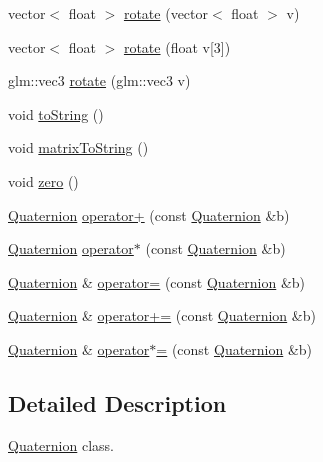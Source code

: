 \begin{DoxyCompactItemize}
\item 
vector$<$ float $>$ \hyperlink{classQuaternion_aff3eac8f2ff148c399fa39e16594ce1f}{rotate} (vector$<$ float $>$ v)
\item 
vector$<$ float $>$ \hyperlink{classQuaternion_a341d532ec38393c75673d1b3a3ec9e2f}{rotate} (float v\mbox{[}3\mbox{]})
\item 
glm\-::vec3 \hyperlink{classQuaternion_a96d763a210463981dc621b0bf8a84259}{rotate} (glm\-::vec3 v)
\item 
void \hyperlink{classQuaternion_aa3bbfe668e104769f47344dc6e63eb5b}{to\-String} ()
\item 
void \hyperlink{classQuaternion_a0bf91c04839f665014253c74a0461461}{matrix\-To\-String} ()
\item 
void \hyperlink{classQuaternion_a5be74768bcc366ea59a9c6adffdcdd4e}{zero} ()
\item 
\hyperlink{classQuaternion}{Quaternion} \hyperlink{classQuaternion_a8ab54a1bd23bcbb4476c831f7c0068a2}{operator+} (const \hyperlink{classQuaternion}{Quaternion} \&b)
\item 
\hyperlink{classQuaternion}{Quaternion} \hyperlink{classQuaternion_af29f524832881bd5d63d5ab91d45f4ec}{operator$\ast$} (const \hyperlink{classQuaternion}{Quaternion} \&b)
\item 
\hyperlink{classQuaternion}{Quaternion} \& \hyperlink{classQuaternion_a3641a98c644ddeea289c8c2346b46e24}{operator=} (const \hyperlink{classQuaternion}{Quaternion} \&b)
\item 
\hyperlink{classQuaternion}{Quaternion} \& \hyperlink{classQuaternion_ab0cb54aa37454407567633657a77a9e3}{operator+=} (const \hyperlink{classQuaternion}{Quaternion} \&b)
\item 
\hyperlink{classQuaternion}{Quaternion} \& \hyperlink{classQuaternion_acb888d289a05c63403790685c10dde1a}{operator$\ast$=} (const \hyperlink{classQuaternion}{Quaternion} \&b)
\end{DoxyCompactItemize}


\subsection{Detailed Description}
\hyperlink{classQuaternion}{Quaternion} class. 

